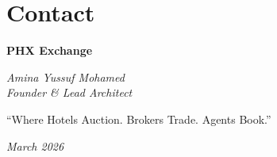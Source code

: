 \documentclass[11pt,a4paper]{article}
\begin{document}
\newpage

\section*{Contact}

\vspace{2cm}

\begin{center}

{\Large \textbf{PHX Exchange}}

\vspace{1cm}

\textit{Amina Yussuf Mohamed}\\
\textit{Founder \& Lead Architect}

\vspace{2cm}

{\large ``Where Hotels Auction. Brokers Trade. Agents Book.''}

\vspace{1cm}

\textit{March 2026}

\end{center}
\end{document}

